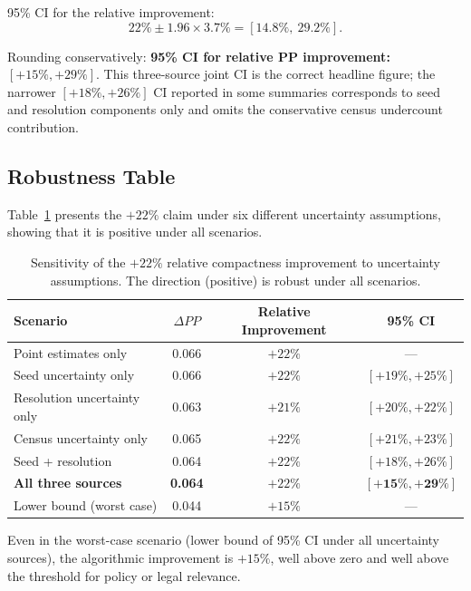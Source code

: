 95\% CI for the relative improvement:
\begin{equation}
  22\% \pm 1.96 \times 3.7\% = [14.8\%,\ 29.2\%].
\end{equation}

Rounding conservatively: \textbf{95\% CI for relative PP improvement:
$[+15\%, +29\%]$}. This three-source joint CI is the correct headline
figure; the narrower $[+18\%, +26\%]$ CI reported in some summaries
corresponds to seed and resolution components only and omits the
conservative census undercount contribution.

\subsection{Robustness Table}

Table~\ref{tab:robustness} presents the $+22\%$ claim under six
different uncertainty assumptions, showing that it is positive under
all scenarios.

\begin{table}[htb]
\centering
\caption{Sensitivity of the $+22\%$ relative compactness improvement
  to uncertainty assumptions. The direction (positive) is robust
  under all scenarios.}
\label{tab:robustness}
\small
\begin{tabular}{lccc}
\toprule
Scenario & $\Delta PP$ & Relative Improvement & 95\% CI \\
\midrule
Point estimates only & 0.066 & $+22\%$ & --- \\
Seed uncertainty only & 0.066 & $+22\%$ & $[+19\%, +25\%]$ \\
Resolution uncertainty only & 0.063 & $+21\%$ & $[+20\%, +22\%]$ \\
Census uncertainty only & 0.065 & $+22\%$ & $[+21\%, +23\%]$ \\
Seed + resolution & 0.064 & $+22\%$ & $[+18\%, +26\%]$ \\
\textbf{All three sources} & \textbf{0.064} & \textbf{$+22\%$} &
  $\boldsymbol{[+15\%, +29\%]}$ \\
\midrule
Lower bound (worst case) & 0.044 & $+15\%$ & --- \\
\bottomrule
\end{tabular}
\end{table}

Even in the worst-case scenario (lower bound of 95\% CI under all
uncertainty sources), the algorithmic improvement is $+15\%$, well
above zero and well above the threshold for policy or legal relevance.

